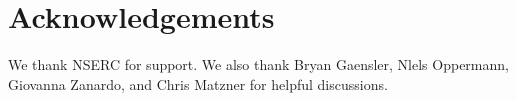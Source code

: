 \documentclass[useAMS,usenatbib]{mn2e}
\begin{document}
\section{Acknowledgements}

We thank NSERC for support. We also thank Bryan Gaensler, Nlels Oppermann, 
Giovanna Zanardo, and Chris Matzner for helpful discussions. 

\newcommand{\araa}{ARA\&A}   %
\newcommand{\afz}{Afz}       %
\newcommand{\aj}{AJ}         %
\newcommand{\azh}{AZh}       %
\newcommand{\aaa}{A\&A}      %
\newcommand{\aas}{A\&AS}     %
\newcommand{\aar}{A\&AR}     %
\newcommand{\apj}{ApJ}       %
\newcommand{\apjs}{ApJS}     %
\newcommand{\apjl}{ApJ}      %
\newcommand{\apss}{Ap\&SS}   %
\newcommand{\baas}{BAAS}     %
\newcommand{\jaa}{JA\&A}     %
\newcommand{\mnras}{MNRAS}   %
\newcommand{\nat}{Nat}       %
\newcommand{\pasj}{PASJ}     %
\newcommand{\pasp}{PASP}     %
\newcommand{\paspc}{PASPC}   %
\newcommand{\qjras}{QJRAS}   %
\newcommand{\sci}{Sci}       %
\newcommand{\solphys}{Solar Physics}       %
\newcommand{\sova}{SvA}      %
\newcommand{\aap}{A\&A}
\newcommand\jcap{{J. Cosmology Astropart. Phys.}}%
\newcommand{\prd}{Phys. Rev. D}

%




\label{lastpage}
\end{document}
